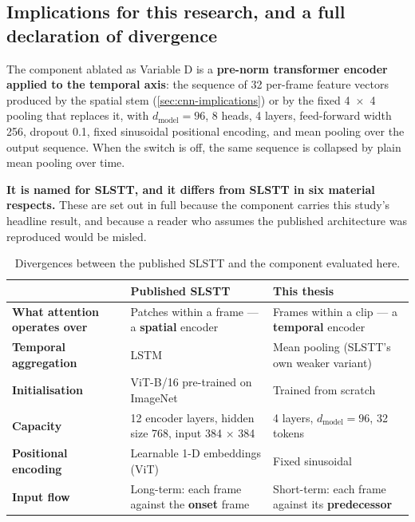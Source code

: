 \subsection{Implications for this research, and a full declaration of divergence}
\label{sec:transformer-implications}

The component ablated as Variable D is a \textbf{pre-norm transformer encoder applied to the temporal axis}: the sequence of 32 per-frame feature vectors produced by the spatial stem (\autoref{sec:cnn-implications}) or by the fixed 4~$\times$~4 pooling that replaces it, with $d_{\text{model}} = 96$, 8 heads, 4 layers, feed-forward width 256, dropout 0.1, fixed sinusoidal positional encoding, and mean pooling over the output sequence. When the switch is off, the same sequence is collapsed by plain mean pooling over time.

\textbf{It is named for SLSTT, and it differs from SLSTT in six material respects.} These are set out in full because the component carries this study's headline result, and because a reader who assumes the published architecture was reproduced would be misled.

\begin{table}[htbp]
	\centering
	\footnotesize
	\begin{tabular}{p{3.2cm} p{4.6cm} p{4.6cm}}
		\hline
		 & \textbf{Published SLSTT~\cite{zhang2022}} & \textbf{This thesis} \\
		\hline
		\textbf{What attention operates over} & Patches within a frame --- a \textbf{spatial} encoder & Frames within a clip --- a \textbf{temporal} encoder \\
		\textbf{Temporal aggregation} & LSTM & Mean pooling (SLSTT's own weaker variant) \\
		\textbf{Initialisation} & ViT-B/16 pre-trained on ImageNet & Trained from scratch \\
		\textbf{Capacity} & 12 encoder layers, hidden size 768, input 384 $\times$ 384 & 4 layers, $d_{\text{model}} = 96$, 32 tokens \\
		\textbf{Positional encoding} & Learnable 1-D embeddings (ViT) & Fixed sinusoidal \\
		\textbf{Input flow} & Long-term: each frame against the \textbf{onset} frame & Short-term: each frame against its \textbf{predecessor} \\
		\hline
	\end{tabular}
	\caption[Divergences between published SLSTT and the component evaluated here]{Divergences between the published SLSTT and the component evaluated here.}
	\label{tab:slstt-divergences}
\end{table}

